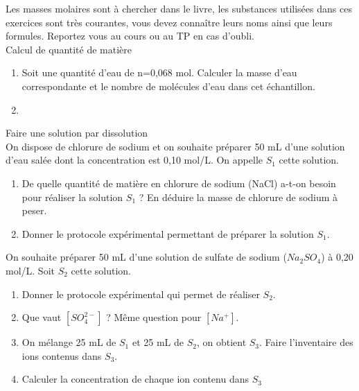  


Les masses molaires sont à chercher dans le livre, les substances utilisées dans ces exercices sont très courantes, vous devez connaître leurs noms ainsi que leurs formules. Reportez vous au cours ou au TP en cas d'oubli.\\
\exo 
\exo Calcul de quantité de matière
\begin{enumerate}
\item Soit une quantité d'eau de n=0,068 mol. Calculer la masse d'eau correspondante et le nombre de molécules d'eau dans cet échantillon.
\item 
\end{enumerate}
\exo Faire une solution par dissolution\\
On dispose de chlorure de sodium et on souhaite préparer  50 mL d'une solution d'eau salée dont la concentration est 0,10 mol/L. On appelle $S_1$ cette solution.
\begin{enumerate}
\item De quelle quantité de matière en chlorure de sodium (NaCl) a-t-on besoin pour réaliser la solution $S_1$ ? En déduire la masse de chlorure de sodium à peser.
\item Donner le protocole expérimental permettant de préparer la solution $S_1$.
\end{enumerate}

On souhaite préparer 50 mL d'une solution de sulfate de sodium ($Na_2SO_4$) à 0,20 mol/L. Soit $S_2$ cette solution.
\begin{enumerate}
\item Donner le protocole expérimental qui permet de réaliser $S_2$.
\item Que vaut $[SO_4^{2-}]$ ? Même question pour $[Na^+]$.
\item On mélange 25 mL de $S_1$ et 25 mL de $S_2$, on obtient $S_3$. Faire l'inventaire des ions contenus dans $S_3$.
\item Calculer la concentration de chaque ion contenu dans $S_3$
\end{enumerate}

